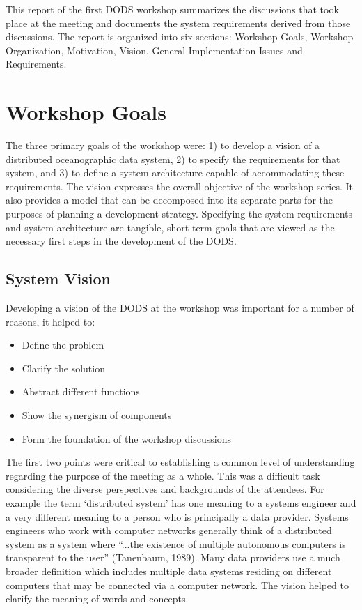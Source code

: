 This report of the first DODS workshop summarizes the discussions that took
place at the meeting and documents the system requirements derived from those
discussions. The report is organized into six sections: Workshop Goals,
Workshop Organization, Motivation, Vision, General Implementation Issues and
Requirements.

\section{\bf Workshop Goals}

The three primary goals of the workshop were: 1) to develop a vision of a
distributed oceanographic data system, 2) to specify the requirements for
that system, and 3) to define a system architecture capable of accommodating
these requirements. The vision expresses the overall objective of the
workshop series. It also provides a model that can be decomposed into its
separate parts for the purposes of planning a development strategy.
Specifying the system requirements and system architecture are tangible,
short term goals that are viewed as the necessary first steps in the
development of the DODS.

\subsection {System Vision}

Developing a vision of the DODS at the workshop was important for a number of
reasons, it helped to:
\begin{itemize}

\item Define the problem

\item Clarify the solution 

\item Abstract different functions

\item Show the synergism of components

\item Form the foundation of the workshop discussions
\end{itemize}
\medskip

The first two points were critical to establishing a common level of
understanding regarding the purpose of the meeting as a whole. This was a
difficult task considering the diverse perspectives and backgrounds of the
attendees. For example the term `distributed system' has one meaning to a
systems engineer and a very different meaning to a person who is principally
a data provider. Systems engineers who work with computer networks generally
think of a distributed system as a system where ``...the existence of
multiple autonomous computers is transparent to the user'' (Tanenbaum,
1989). Many data providers use a much broader definition which includes
multiple data systems residing on different computers that may be connected
via a computer network.  The vision helped to clarify the meaning of words
and concepts.

